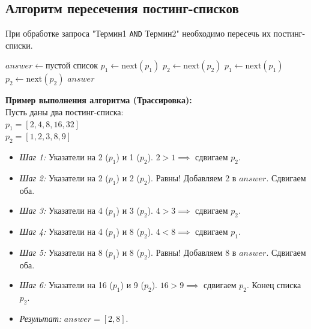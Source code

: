 \documentclass[12pt,a4paper]{article}
\begin{document}
\subsection{Алгоритм пересечения постинг-списков}
При обработке запроса "Термин1 \texttt{AND} Термин2" необходимо пересечь их постинг-списки.

\begin{algorithm}[H]
\caption{Пересечение двух отсортированных постинг-списков}
\begin{algorithmic}[1]
    \State $answer \gets \text{пустой список}$
            \State {}
            \State $p_1 \gets \text{next}(p_1)$
            \State $p_2 \gets \text{next}(p_2)$
            \State $p_1 \gets \text{next}(p_1)$
        \Else
            \State $p_2 \gets \text{next}(p_2)$
        \EndIf
    \EndWhile
    \State \Return $answer$
\EndFunction
\end{algorithmic}
\end{algorithm}

\textbf{Пример выполнения алгоритма (Трассировка):}\\
Пусть даны два постинг-списка:\\
$p_1 = [2, 4, 8, 16, 32]$\\
$p_2 = [1, 2, 3, 8, 9]$

\begin{itemize}
    \item \textit{Шаг 1:} Указатели на 2 ($p_1$) и 1 ($p_2$). $2 > 1 \implies$ сдвигаем $p_2$.
    \item \textit{Шаг 2:} Указатели на 2 ($p_1$) и 2 ($p_2$). Равны! Добавляем 2 в $answer$. Сдвигаем оба.
    \item \textit{Шаг 3:} Указатели на 4 ($p_1$) и 3 ($p_2$). $4 > 3 \implies$ сдвигаем $p_2$.
    \item \textit{Шаг 4:} Указатели на 4 ($p_1$) и 8 ($p_2$). $4 < 8 \implies$ сдвигаем $p_1$.
    \item \textit{Шаг 5:} Указатели на 8 ($p_1$) и 8 ($p_2$). Равны! Добавляем 8 в $answer$. Сдвигаем оба.
    \item \textit{Шаг 6:} Указатели на 16 ($p_1$) и 9 ($p_2$). $16 > 9 \implies$ сдвигаем $p_2$. Конец списка $p_2$.
    \item \textit{Результат:} $answer = [2, 8]$.
\end{itemize}
\end{document}
